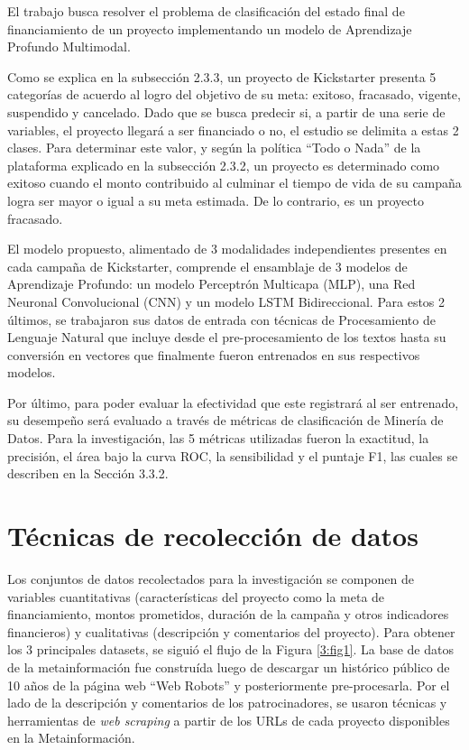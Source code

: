 El trabajo busca resolver el problema de clasificación del estado final de financiamiento de un proyecto implementando un modelo de Aprendizaje Profundo Multimodal.

Como se explica en la subsección 2.3.3, un proyecto de Kickstarter presenta 5 categorías de acuerdo al logro del objetivo de su meta: exitoso, fracasado, vigente, suspendido y cancelado. Dado que se busca predecir si, a partir de una serie de variables, el proyecto llegará a ser financiado o no, el estudio se delimita a estas 2 clases. Para determinar este valor, y según la política “Todo o Nada” de la plataforma explicado en la subsección 2.3.2, un proyecto es determinado como exitoso cuando el monto contribuido al culminar el tiempo de vida de su campaña logra ser mayor o igual a su meta estimada. De lo contrario, es un proyecto fracasado.

El modelo propuesto, alimentado de 3 modalidades independientes presentes en cada campaña de Kickstarter, comprende el ensamblaje de 3 modelos de Aprendizaje Profundo: un modelo Perceptrón Multicapa (MLP), una Red Neuronal Convolucional (CNN) y un modelo LSTM Bidireccional. Para estos 2 últimos, se trabajaron sus datos de entrada con técnicas de Procesamiento de Lenguaje Natural que incluye desde el pre-procesamiento de los textos hasta su conversión en vectores que finalmente fueron entrenados en sus respectivos modelos.

Por último, para poder evaluar la efectividad que este registrará al ser entrenado, su desempeño será evaluado a través de métricas de clasificación de Minería de Datos. Para la investigación, las 5 métricas utilizadas fueron la exactitud, la precisión, el área bajo la curva ROC, la sensibilidad y el puntaje F1, las cuales se describen en la Sección 3.3.2.

\section{Técnicas de recolección de datos}
Los conjuntos de datos recolectados para la investigación se componen de variables cuantitativas (características del proyecto como la meta de financiamiento, montos prometidos, duración de la campaña y otros indicadores financieros) y cualitativas (descripción y comentarios del proyecto). Para obtener los 3 principales datasets, se siguió el flujo de la Figura \ref{3:fig1}. La base de datos de la metainformación fue construída luego de descargar un histórico público de 10 años de la página web “Web Robots” y posteriormente pre-procesarla. Por el lado de la descripción y comentarios de los patrocinadores, se usaron técnicas y herramientas de \textit{web scraping} a partir de los URLs de cada proyecto disponibles en la Metainformación.


